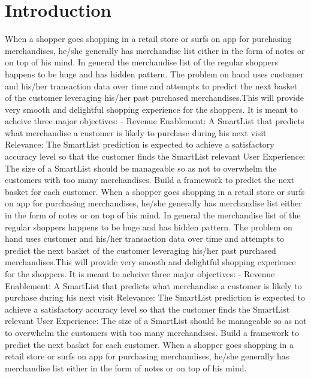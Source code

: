 \section{Introduction}
When a shopper goes shopping in a retail store or surfs on app for purchasing merchandises, 
he/she generally has merchandise list either in the form of notes or on top of his mind. 
In general the merchandise list of the regular shoppers happens to be huge and has hidden pattern. 
The problem on hand uses customer and his/her transaction data over time and attempts to predict 
the next basket of the customer leveraging his/her past purchased merchandises.This will provide 
very smooth and delightful shopping experience for the shoppers. It is meant to acheive three major 
objectives: - Revenue Enablement: A SmartList that predicts what merchandise a customer is likely to 
purchase during his next visit Relevance: The SmartList prediction is expected to achieve a 
satisfactory accuracy level so that the customer finds the SmartList relevant User Experience: 
The size of a SmartList should be manageable so as not to overwhelm the customers with too many 
merchandises. Build a framework to predict the next basket for each customer.
When a shopper goes shopping in a retail store or surfs on app for purchasing merchandises, 
he/she generally has merchandise list either in the form of notes or on top of his mind. 
In general the merchandise list of the regular shoppers happens to be huge and has hidden pattern. 
The problem on hand uses customer and his/her transaction data over time and attempts to predict 
the next basket of the customer leveraging his/her past purchased merchandises.This will provide 
very smooth and delightful shopping experience for the shoppers. It is meant to acheive three major 
objectives: - Revenue Enablement: A SmartList that predicts what merchandise a customer is likely to 
purchase during his next visit Relevance: The SmartList prediction is expected to achieve a 
satisfactory accuracy level so that the customer finds the SmartList relevant User Experience: 
The size of a SmartList should be manageable so as not to overwhelm the customers with too many 
merchandises. Build a framework to predict the next basket for each customer.
When a shopper goes shopping in a retail store or surfs on app for purchasing merchandises, 
he/she generally has merchandise list either in the form of notes or on top of his mind. 